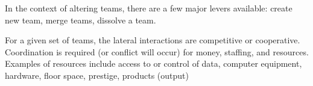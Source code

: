 
In the context of altering teams, there are a few major levers available: create new team, merge teams, dissolve a team. 

For a given set of teams, the lateral interactions are competitive or cooperative. Coordination is required (or conflict will occur) for money, staffing, and resources. Examples of resources include access to or control of data, computer equipment, hardware, floor space, prestige, products (output)